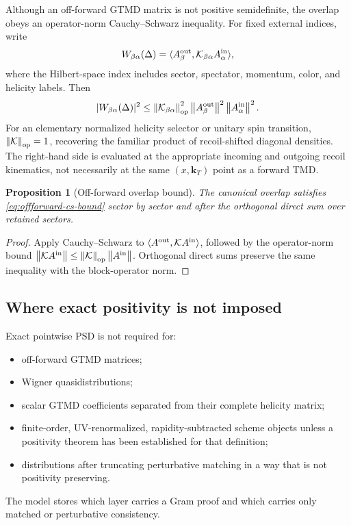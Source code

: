 \documentclass[11pt]{article}
\newtheorem{proposition}[definition]{Proposition}
\newcommand{\kT}{\bm{k}_{T}}
\newcommand{\cK}{\mathcal K}
\newcommand{\norm}[1]{\left\lVert#1\right\rVert}
\begin{document}
Although an off-forward GTMD matrix is not positive semidefinite, the overlap
obeys an operator-norm Cauchy--Schwarz inequality.  For fixed external
indices, write
\begin{equation}
 W_{\beta\alpha}(\Delta)
 =\langle A_{\beta}^{\rm out},
 \cK_{\beta\alpha}A_{\alpha}^{\rm in}\rangle,
\label{eq:offforward-amplitude-form}
\end{equation}
where the Hilbert-space index includes sector, spectator, momentum, color,
and helicity labels.  Then
\begin{equation}
 |W_{\beta\alpha}(\Delta)|^2
 \le
 \norm{\cK_{\beta\alpha}}_{\rm op}^{2}
 \norm{A_{\beta}^{\rm out}}^2
 \norm{A_{\alpha}^{\rm in}}^2.
\label{eq:offforward-cs-bound}
\end{equation}
For an elementary normalized helicity selector or unitary spin transition,
\(\norm{\cK}_{\rm op}=1\), recovering the familiar product of recoil-shifted
diagonal densities.  The right-hand side is evaluated at the appropriate
incoming and outgoing recoil kinematics, not necessarily at the same
\((x,\kT)\) point as a forward TMD.

\begin{proposition}[Off-forward overlap bound]
\label{prop:offforward-bound}
The canonical overlap satisfies \cref{eq:offforward-cs-bound} sector by
sector and after the orthogonal direct sum over retained sectors.
\end{proposition}

\begin{proof}
Apply Cauchy--Schwarz to
\(\langle A^{\rm out},\cK A^{\rm in}\rangle\), followed by the operator-norm
bound \(\norm{\cK A^{\rm in}}\le
\norm{\cK}_{\rm op}\norm{A^{\rm in}}\).  Orthogonal direct sums preserve the
same inequality with the block-operator norm.
\end{proof}

\subsection{Where exact positivity is not imposed}

Exact pointwise PSD is not required for:
\begin{itemize}
\item off-forward GTMD matrices;
\item Wigner quasidistributions;
\item scalar GTMD coefficients separated from their complete helicity matrix;
\item finite-order, UV-renormalized, rapidity-subtracted scheme objects unless
      a positivity theorem has been established for that definition;
\item distributions after truncating perturbative matching in a way that is
      not positivity preserving.
\end{itemize}
The model stores which layer carries a Gram proof and which carries only
matched or perturbative consistency.
\end{document}
